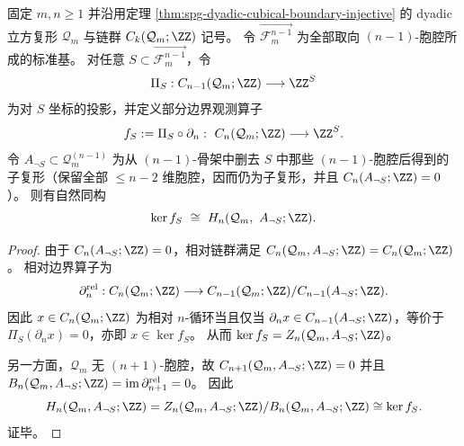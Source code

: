 \begin{theorem}[部分边界观测的屏幕核与相对顶维同调]\label{thm:spg-partial-boundary-screen-kernel-relative-homology}
固定 \(m,n\ge 1\) 并沿用定理 \ref{thm:spg-dyadic-cubical-boundary-injective} 的 dyadic 立方复形 \(\mathcal Q_m\) 与链群 \(C_k(\mathcal Q_m;\ZZ)\) 记号。
令 \(\overrightarrow{\mathcal F_{m}^{n-1}}\) 为全部取向 \((n-1)\)-胞腔所成的标准基。
对任意 \(S\subset \overrightarrow{\mathcal F_{m}^{n-1}}\)，令
\[
\Pi_S:C_{n-1}(\mathcal Q_m;\ZZ)\longrightarrow \ZZ^{S}
\]
为对 \(S\) 坐标的投影，并定义部分边界观测算子
\[
f_S:=\Pi_S\circ\partial_n:\ C_n(\mathcal Q_m;\ZZ)\longrightarrow \ZZ^{S}.
\]
令 \(A_{\neg S}\subset \mathcal Q_m^{(n-1)}\) 为从 \((n-1)\)-骨架中删去 \(S\) 中那些 \((n-1)\)-胞腔后得到的子复形（保留全部 \(\le n-2\) 维胞腔，因而仍为子复形，并且 \(C_n(A_{\neg S};\ZZ)=0\)）。
则有自然同构
\[
\ker f_S\ \cong\ H_n(\mathcal Q_m,\ A_{\neg S};\ZZ).
\]
\end{theorem}
\begin{proof}
由于 \(C_n(A_{\neg S};\ZZ)=0\)，相对链群满足 \(C_n(\mathcal Q_m,A_{\neg S};\ZZ)=C_n(\mathcal Q_m;\ZZ)\)。
相对边界算子为
\[
\partial_n^{\mathrm{rel}}:C_n(\mathcal Q_m;\ZZ)\longrightarrow C_{n-1}(\mathcal Q_m;\ZZ)/C_{n-1}(A_{\neg S};\ZZ).
\]
因此 \(x\in C_n(\mathcal Q_m;\ZZ)\) 为相对 \(n\)-循环当且仅当 \(\partial_n x\in C_{n-1}(A_{\neg S};\ZZ)\)，等价于 \(\Pi_S(\partial_n x)=0\)，亦即 \(x\in\ker f_S\)。
从而 \(\ker f_S=Z_n(\mathcal Q_m,A_{\neg S};\ZZ)\)。
\par
另一方面，\(\mathcal Q_m\) 无 \((n+1)\)-胞腔，故 \(C_{n+1}(\mathcal Q_m,A_{\neg S};\ZZ)=0\) 并且 \(B_n(\mathcal Q_m,A_{\neg S};\ZZ)=\mathrm{im}\,\partial_{n+1}^{\mathrm{rel}}=0\)。
因此
\[
H_n(\mathcal Q_m,A_{\neg S};\ZZ)=Z_n(\mathcal Q_m,A_{\neg S};\ZZ)/B_n(\mathcal Q_m,A_{\neg S};\ZZ)\cong \ker f_S.
\]
证毕。
\end{proof}

